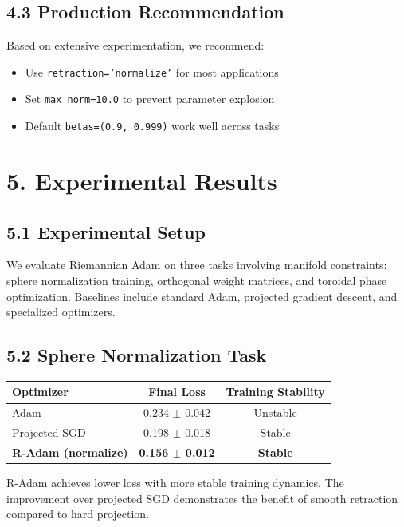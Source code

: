 \documentclass[12pt]{article}
\begin{document}
\subsection{4.3 Production Recommendation}

Based on extensive experimentation, we recommend:
\begin{itemize}
\item Use \texttt{retraction='normalize'} for most applications
\item Set \texttt{max\_norm=10.0} to prevent parameter explosion
\item Default \texttt{betas=(0.9, 0.999)} work well across tasks
\end{itemize}

\section{5. Experimental Results}

\subsection{5.1 Experimental Setup}

We evaluate Riemannian Adam on three tasks involving manifold constraints: sphere normalization training, orthogonal weight matrices, and toroidal phase optimization. Baselines include standard Adam, projected gradient descent, and specialized optimizers.

\subsection{5.2 Sphere Normalization Task}

\begin{center}
\begin{tabular}{|l|c|c|}
\hline
\textbf{Optimizer} & \textbf{Final Loss} & \textbf{Training Stability} \\
\hline
Adam & 0.234 $\pm$ 0.042 & Unstable \\
Projected SGD & 0.198 $\pm$ 0.018 & Stable \\
\textbf{R-Adam (normalize)} & \textbf{0.156 $\pm$ 0.012} & \textbf{Stable} \\
\hline
\end{tabular}
\end{center}

R-Adam achieves lower loss with more stable training dynamics. The improvement over projected SGD demonstrates the benefit of smooth retraction compared to hard projection.
\end{document}

